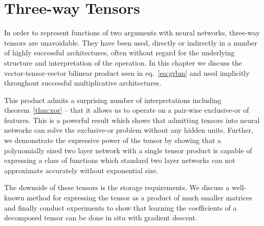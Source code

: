 
\chapter{Three-way Tensors}\label{C:tens}

In order to represent functions of two arguments with neural networks, three-way tensors are 
unavoidable. They have been used, directly or indirectly in a number of highly
successful architectures, often without regard for the underlying structure and interpretation of the
operation. In this chapter we discuss the vector-tensor-vector bilinear product seen in 
eq.~\eqref{eq:grbm} and used implicitly throughout successful multiplicative architectures.

This product admits a surprising
number of interpretations including theorem~\ref{thm:xor} -- that it allows us to operate on a
pair-wise exclusive-or of features. This is a powerful result which shows that admitting tensors
into neural networks can solve the exclusive-or problem without any hidden units. Further, we
demonstrate the expressive power of the tensor by showing that a polynomially sized two layer
network with a
single tensor product is capable of expressing a class of functions which standard two layer networks
can not approximate accurately without exponential size.

The downside of these tensors is the storage requirements. We discuss a well-known method for
expressing the tensor as a product of much smaller matrices and
finally conduct experiments to show that
learning the coefficients of a decomposed tensor can be done in situ with gradient descent.

